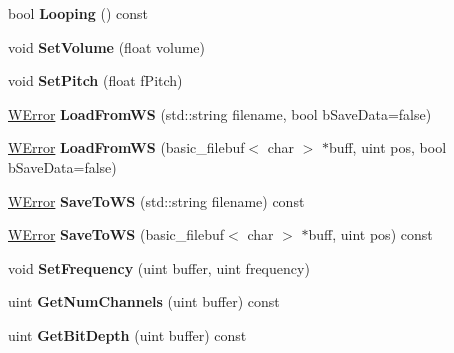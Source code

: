 \begin{DoxyCompactItemize}
\item 
bool {\bfseries Looping} () const \hypertarget{class_w_sound_aff02033d1322db7414b23a64c9653b20}{}\label{class_w_sound_aff02033d1322db7414b23a64c9653b20}

\item 
void {\bfseries Set\+Volume} (float volume)\hypertarget{class_w_sound_aed18e6f550768e91bc074abd1402a111}{}\label{class_w_sound_aed18e6f550768e91bc074abd1402a111}

\item 
void {\bfseries Set\+Pitch} (float f\+Pitch)\hypertarget{class_w_sound_a4527fa7c99243aae40d8d89097376b07}{}\label{class_w_sound_a4527fa7c99243aae40d8d89097376b07}

\item 
\hyperlink{class_w_error}{W\+Error} {\bfseries Load\+From\+WS} (std\+::string filename, bool b\+Save\+Data=false)\hypertarget{class_w_sound_a430be14be1b58bd272091445f9a63ee8}{}\label{class_w_sound_a430be14be1b58bd272091445f9a63ee8}

\item 
\hyperlink{class_w_error}{W\+Error} {\bfseries Load\+From\+WS} (basic\+\_\+filebuf$<$ char $>$ $\ast$buff, uint pos, bool b\+Save\+Data=false)\hypertarget{class_w_sound_ac6d3e7b29e23634c98cdc79f99fbd3f1}{}\label{class_w_sound_ac6d3e7b29e23634c98cdc79f99fbd3f1}

\item 
\hyperlink{class_w_error}{W\+Error} {\bfseries Save\+To\+WS} (std\+::string filename) const \hypertarget{class_w_sound_a540b3ee598faa37214b850cb36517c6c}{}\label{class_w_sound_a540b3ee598faa37214b850cb36517c6c}

\item 
\hyperlink{class_w_error}{W\+Error} {\bfseries Save\+To\+WS} (basic\+\_\+filebuf$<$ char $>$ $\ast$buff, uint pos) const \hypertarget{class_w_sound_a6b3f6fcdd5f3a80bac57f1c1fd38e0b8}{}\label{class_w_sound_a6b3f6fcdd5f3a80bac57f1c1fd38e0b8}

\item 
void {\bfseries Set\+Frequency} (uint buffer, uint frequency)\hypertarget{class_w_sound_af1553604ae86e39957dfee01ea007eff}{}\label{class_w_sound_af1553604ae86e39957dfee01ea007eff}

\item 
uint {\bfseries Get\+Num\+Channels} (uint buffer) const \hypertarget{class_w_sound_a42fa196bd775c16af446350228a81d62}{}\label{class_w_sound_a42fa196bd775c16af446350228a81d62}

\item 
uint {\bfseries Get\+Bit\+Depth} (uint buffer) const \hypertarget{class_w_sound_a5bffa98088997225d247fb03a4a61eca}{}\label{class_w_sound_a5bffa98088997225d247fb03a4a61eca}


\end{DoxyCompactItemize}
